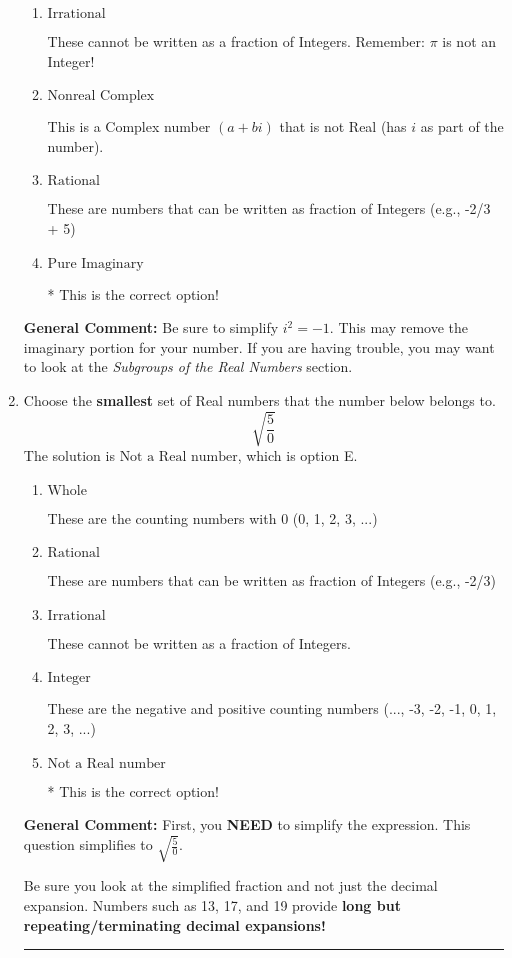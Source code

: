 \documentclass{extbook}[14pt]
\newcommand{\litem}[1]{\item #1

\rule{\textwidth}{0.4pt}}
\begin{document}
\begin{enumerate}
{\begin{enumerate}[label=\Alph*.]
This is not a number. The only non-Complex number we know is dividing by 0 as this is not a number!
\item \( \text{Irrational} \)

These cannot be written as a fraction of Integers. Remember: $\pi$ is not an Integer!
\item \( \text{Nonreal Complex} \)

This is a Complex number $(a+bi)$ that is not Real (has $i$ as part of the number).
\item \( \text{Rational} \)

These are numbers that can be written as fraction of Integers (e.g., -2/3 + 5)
\item \( \text{Pure Imaginary} \)

* This is the correct option!
\end{enumerate}

\textbf{General Comment:} Be sure to simplify $i^2 = -1$. This may remove the imaginary portion for your number. If you are having trouble, you may want to look at the \textit{Subgroups of the Real Numbers} section.
}
\litem{
Choose the \textbf{smallest} set of Real numbers that the number below belongs to.
\[ \sqrt{\frac{5}{0}} \]The solution is \( \text{Not a Real number} \), which is option E.\begin{enumerate}[label=\Alph*.]
\item \( \text{Whole} \)

These are the counting numbers with 0 (0, 1, 2, 3, ...)
\item \( \text{Rational} \)

These are numbers that can be written as fraction of Integers (e.g., -2/3)
\item \( \text{Irrational} \)

These cannot be written as a fraction of Integers.
\item \( \text{Integer} \)

These are the negative and positive counting numbers (..., -3, -2, -1, 0, 1, 2, 3, ...)
\item \( \text{Not a Real number} \)

* This is the correct option!
\end{enumerate}

\textbf{General Comment:} First, you \textbf{NEED} to simplify the expression. This question simplifies to $\sqrt{\frac{5}{0}}$. 
 
 Be sure you look at the simplified fraction and not just the decimal expansion. Numbers such as 13, 17, and 19 provide \textbf{long but repeating/terminating decimal expansions!} 
 
}
\end{enumerate}
\end{document}
